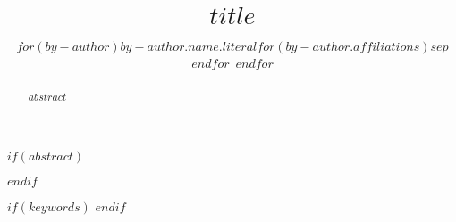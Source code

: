 \title{$title$}

\author{
$for(by-author)$$by-author.name.literal$$for(by-author.affiliations)$$sep$$endfor$~$endfor$
}

\address{
$for(by-affiliation)$
 $it.name$
$endfor$
}

$if(abstract)$
\begin{abstract}
$abstract$
\end{abstract}
$endif$

$if(keywords)$
$endif$

\maketitle
